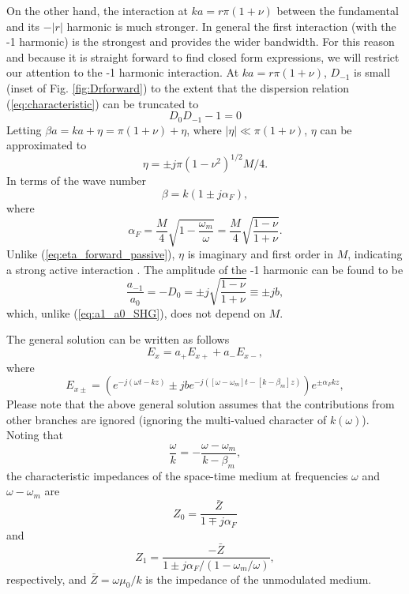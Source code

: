 \documentclass[journal]{IEEEtran}
\begin{document}
On the other hand, the interaction at $ka=r\pi(1+\nu)$ between the fundamental and its $-|r|$ harmonic is much stronger. In general the first interaction (with the -1 harmonic) is the strongest and provides the wider bandwidth. For this reason and because it is straight forward to find closed form expressions, we will restrict our attention to the -1 harmonic interaction. At $ka=r\pi(1+\nu)$, $D_{-1}$ is small (inset of Fig. \ref{fig:Drforward}) to the extent that the dispersion relation (\ref{eq:characteristic}) can be truncated to
\begin{equation}
\label{eq:SecularForwardSimplified}
D_0D_{-1}-1=0
\end{equation}
Letting $\beta a=ka+\eta=\pi(1+\nu)+\eta$, where $|\eta|\ll\pi(1+\nu)$, $\eta$ can be approximated to
\begin{equation}
\label{eq:Eta_Fwd}
\eta=\pm j\pi(1-\nu^2)^{1/2}M/4.
\end{equation}
In terms of the wave number
\begin{equation}
\beta=k\left(1\pm j\alpha_F\right),
\end{equation}
where 
\begin{equation}
\alpha_F=\frac{M}{4}\sqrt{1-\frac{\omega_m}{\omega}}=\frac{M}{4}\sqrt{\frac{1-\nu}{1+\nu}}.
\end{equation}
Unlike (\ref{eq:eta_forward_passive}), $\eta$ is imaginary and first order in $M$, indicating a strong active interaction \cite{Louisell1960}. The amplitude of the -1 harmonic can be found to be
\begin{equation}
\frac{a_{-1}}{a_0}=-D_0=\pm j\sqrt{\frac{1-\nu}{1+\nu}}\equiv \pm jb,
\end{equation}
which, unlike (\ref{eq:a1_a0_SHG}), does not depend on $M$.

The general solution can be written as follows \cite{Simon1960}
\begin{equation}
E_x=a_+E_{x+}+a_-E_{x-},
\end{equation}
where
\begin{equation}
\label{eq:Ex}
E_{x\pm}=\left(e^{-j\left(\omega t-kz\right)}\pm jbe^{-j\left(\left[\omega-\omega_m\right]t-\left[k-\beta_m\right]z\right)}\right)e^{\pm\alpha_Fkz},
\end{equation}
Please note that the above general solution assumes that the contributions from other branches are ignored (ignoring the multi-valued character of $k(\omega)$). Noting that \cite{Simon1960} 
\begin{equation}
\label{eq:phasesynchronismforward}
\frac{\omega}{k}=-\frac{\omega-\omega_m}{k-\beta_m},
\end{equation}
 the characteristic impedances of the space-time medium at frequencies $\omega$ and $\omega-\omega_m$ are
\begin{equation}
\label{eq:Z0_forward}
Z_0=\frac{\bar{Z}}{1\mp j\alpha_F }
\end{equation}
and 
\begin{equation}
\label{eq:Z1_forward}
Z_1=\frac{-\bar{Z}}{1\pm j\alpha_F/\left(1-\omega_m/\omega\right)},
\end{equation}
respectively, and $\bar{Z}=\omega\mu_0/k$ is the impedance of the unmodulated medium.
\end{document}
